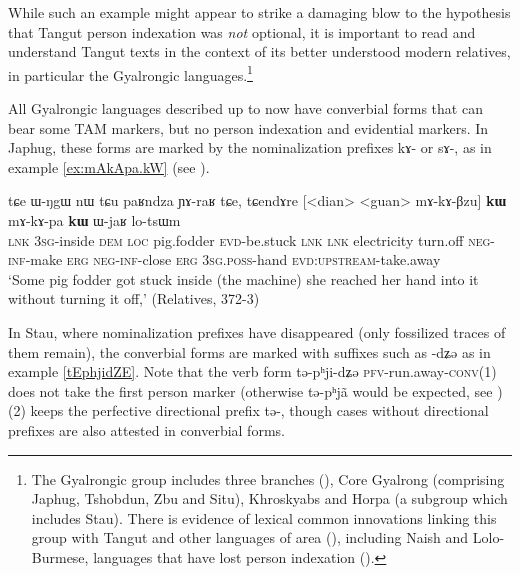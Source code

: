 \documentclass[oldfontcommands,oneside,a4paper,11pt]{article}
\newcommand{\ipa}[1]{{\phon \mbox{#1}}} %
\begin{document}
While such an example might appear to strike a damaging blow to the hypothesis that Tangut person indexation was \textit{not} optional, it is important to read and understand Tangut texts in the context of its better understood modern relatives, in particular the Gyalrongic languages.\footnote{The Gyalrongic group includes three branches (\citealt{jackson00sidaba, jackson00puxi}), Core Gyalrong (comprising Japhug, Tshobdun, Zbu and Situ), Khroskyabs and Horpa (a subgroup which includes Stau). There is evidence of lexical common innovations linking this group with Tangut and other languages of area (\citealt{jacques14esquisse}), including Naish and Lolo-Burmese, languages that have lost person indexation (\citealt{jacques.michaud11naish}).}

All Gyalrongic languages described up to now have converbial forms that can bear some TAM markers, but no person indexation and evidential markers. In Japhug, these forms are   marked by the nominalization prefixes \ipa{kɤ-} or \ipa{sɤ-}, as in example \ref{ex:mAkApa.kW} (see \citealt{jacques14linking}).

\begin{exe}
\ex \label{ex:mAkApa.kW}
\gll
\ipa{tɕe}   	\ipa{ɯ-ŋgɯ}   	\ipa{nɯ} \ipa{tɕu}   	\ipa{paʁndza}   	\ipa{ɲɤ-raʁ}   	\ipa{tɕe,}   	\ipa{tɕendɤre}   	[<dian>   	<guan>   	\ipa{mɤ-kɤ-βzu}] 	\ipa{\textbf{kɯ}}   	\ipa{mɤ-kɤ-pa}   	\ipa{\textbf{kɯ}}   	\ipa{ɯ-jaʁ}   	\ipa{lo-tsɯm}   \\
\textsc{lnk} \textsc{3sg}-inside \textsc{dem} \textsc{loc} pig.fodder \textsc{evd}-be.stuck \textsc{lnk}
\textsc{lnk} electricity turn.off \textsc{neg-inf}-make \textsc{erg}  \textsc{neg-inf}-close \textsc{erg}  \textsc{3sg.poss}-hand \textsc{evd:upstream}-take.away \\
\glt `Some pig fodder got stuck inside (the machine) she reached her hand into it without turning it off,' (Relatives, 372-3)
\end{exe} 

In Stau, where nominalization prefixes have disappeared (only  fossilized traces of them remain), the converbial forms are marked with suffixes such as \ipa{-dʑə} as in example \ref{tEphjidZE}. Note that the verb form \ipa{tə-pʰji-dʑə} \textsc{pfv}-run.away-\textsc{conv}(1) does not take the first person marker (otherwise \ipa{tə-pʰjã} would be expected, see \citealt{jacques14rtau}) (2) keeps the perfective directional prefix \ipa{tə-}, though cases without directional prefixes are also attested in converbial forms.
\end{document}
